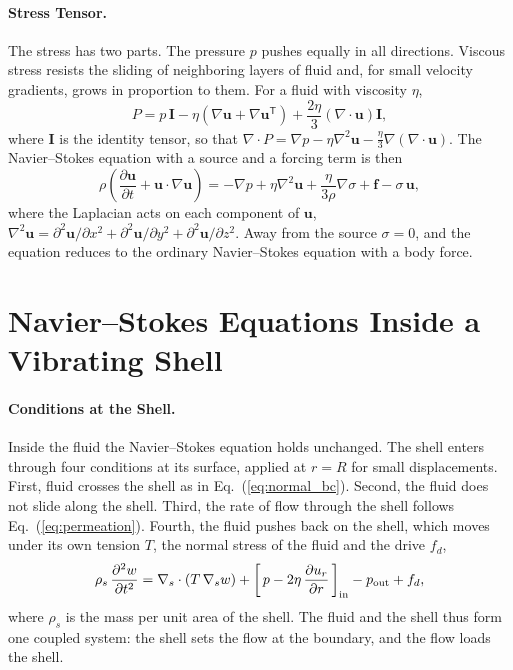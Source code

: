 \documentclass[12pt]{article}
\begin{document}
\paragraph{Stress Tensor.} The stress has two parts. The pressure $p$ pushes equally in all directions. Viscous stress resists the sliding of neighboring layers of fluid and, for small velocity gradients, grows in proportion to them. For a fluid with viscosity $\eta$,
%
\begin{equation}
P = p\,\mathbf{I} - \eta\left(\nabla\bm{u} + \nabla\bm{u}^{\mathsf T}\right) + \frac{2\eta}{3}\left(\nabla\cdot\bm{u}\right)\mathbf{I},
\end{equation}
%
where $\mathbf{I}$ is the identity tensor, so that $\nabla\cdot P = \nabla p - \eta\nabla^2\bm{u} - \tfrac{\eta}{3}\nabla(\nabla\cdot\bm{u})$. The Navier--Stokes equation with a source and a forcing term is then
%
\begin{equation}
\rho\left(\frac{\partial\bm{u}}{\partial t} + \bm{u}\cdot\nabla\bm{u}\right) = -\nabla p + \eta\nabla^2\bm{u} + \frac{\eta}{3\rho}\nabla\sigma + \bm{f} - \sigma\,\bm{u},
\label{eq:ns}
\end{equation}
%
where the Laplacian acts on each component of $\bm{u}$, $\nabla^2\bm{u} = \partial^2\bm{u}/\partial x^2 + \partial^2\bm{u}/\partial y^2 + \partial^2\bm{u}/\partial z^2$. Away from the source $\sigma = 0$, and the equation reduces to the ordinary Navier--Stokes equation with a body force.

\section*{Navier--Stokes Equations Inside a Vibrating Shell}

\paragraph{Conditions at the Shell.} Inside the fluid the Navier--Stokes equation holds unchanged. The shell enters through four conditions at its surface, applied at $r = R$ for small displacements. First, fluid crosses the shell as in Eq.~(\ref{eq:normal_bc}). Second, the fluid does not slide along the shell. Third, the rate of flow through the shell follows Eq.~(\ref{eq:permeation}). Fourth, the fluid pushes back on the shell, which moves under its own tension $T$, the normal stress of the fluid and the drive $f_d$,
%
\begin{equation}
\rho_s\,\frac{\partial^2 w}{\partial t^2} = \nabla_s\cdot\left(T\,\nabla_s w\right) + \left[\,p - 2\eta\,\frac{\partial u_r}{\partial r}\,\right]_{\rm in} - p_{\rm out} + f_d,
\label{eq:shell}
\end{equation}
%
where $\rho_s$ is the mass per unit area of the shell. The fluid and the shell thus form one coupled system: the shell sets the flow at the boundary, and the flow loads the shell.
\end{document}
